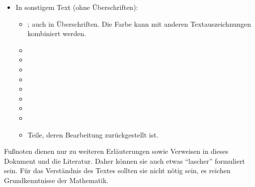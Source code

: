 \begin{itemize}
	\item In sonstigem Text (ohne Überschriften):
	\begin{itemize}
		\item {}; auch in Überschriften.
			Die Farbe kann mit anderen Textauszeichnungen kombiniert werden.
		\item {}
		\item {}
		\item {}
		\item {}
		\item {}
		\item {}
		\item {}
		\item {}
		\iftestFlg
			\item
			\begin{offen}
				Teile, deren Bearbeitung zurückgestellt ist.
			\end{offen}
		\else\fi
	\end{itemize}

\end{itemize}

Fußnoten dienen nur zu weiteren Erläuterungen sowie Verweisen in dieses Dokument und die Literatur.
Daher können sie auch etwas "`lascher"' formuliert sein.
Für das Verständnis des Textes sollten sie nicht nötig sein, es reichen Grundkenntnisse der Mathematik.

\Endchapter
